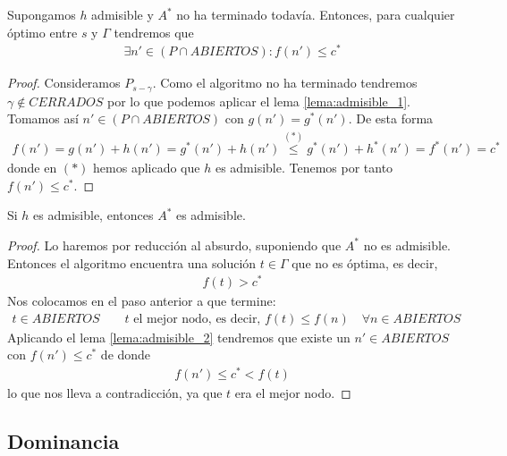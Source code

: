 \begin{lema}\label{lema:admisible_2}
    Supongamos $h$ admisible y $A^*$ no ha terminado todavía. Entonces, para cualquier óptimo entre $s$ y $\Gamma$ tendremos que 
    \begin{gather*}
        \exists n' \in (P \cap ABIERTOS) : f(n') \leq c^*
    \end{gather*} 

    \begin{proof}
        Consideramos $P_{s-\gamma}$. Como el algoritmo no ha terminado tendremos $\gamma \notin CERRADOS$ por lo que podemos aplicar el lema \ref{lema:admisible_1}. Tomamos así $n'\in (P \cap ABIERTOS)$ con $g(n') = g^*(n')$. De esta forma
        \begin{gather*}
            f(n') = g(n') + h(n') = g^*(n') + h(n') \overset{(\ast)}{\leq} g^*(n') + h^*(n') = f^*(n') = c^*
        \end{gather*}
        donde en $(\ast)$ hemos aplicado que $h$ es admisible. Tenemos por tanto $f(n')\leq c^*$.
    \end{proof}
\end{lema}

\begin{teo}
    Si $h$ es admisible, entonces $A^*$ es admisible.
    \begin{proof}
        Lo haremos por reducción al absurdo, suponiendo que $A^*$ no es admisible. Entonces el algoritmo encuentra una solución $t\in \Gamma$ que no es óptima, es decir, 
        \begin{gather*}
            f(t) > c^*
        \end{gather*} 
        Nos colocamos en el paso anterior a que termine:
        \begin{gather*}
            t\in ABIERTOS \qquad t \text{ el mejor nodo, es decir, } f(t) \leq f(n) \quad \forall n \in ABIERTOS
        \end{gather*}
        Aplicando el lema \ref{lema:admisible_2} tendremos que existe un $n'\in ABIERTOS$ con $f(n')\leq c^*$ de donde
        \begin{gather*}
            f(n') \leq c^* < f(t)
        \end{gather*}
        lo que nos lleva a contradicción, ya que $t$ era el mejor nodo.
    \end{proof}
\end{teo}

\subsection{Dominancia}

